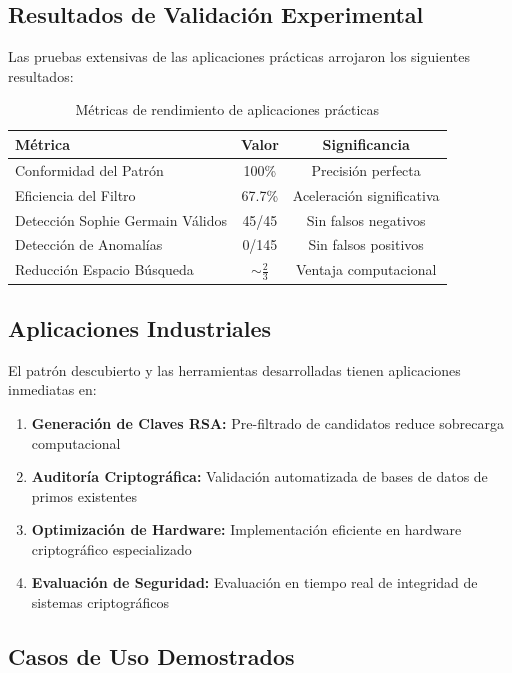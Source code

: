 \documentclass[11pt,a4paper]{article}
\theoremstyle{definition}
\theoremstyle{remark}
\begin{document}
\subsection{Resultados de Validación Experimental}

Las pruebas extensivas de las aplicaciones prácticas arrojaron los siguientes resultados:

\begin{table}[h]
\centering
\begin{tabular}{|l|c|c|}
\hline
\textbf{Métrica} & \textbf{Valor} & \textbf{Significancia} \\
\hline
Conformidad del Patrón & 100\% & Precisión perfecta \\
Eficiencia del Filtro & 67.7\% & Aceleración significativa \\
Detección Sophie Germain Válidos & 45/45 & Sin falsos negativos \\
Detección de Anomalías & 0/145 & Sin falsos positivos \\
Reducción Espacio Búsqueda & $\sim\frac{2}{3}$ & Ventaja computacional \\
\hline
\end{tabular}
\caption{Métricas de rendimiento de aplicaciones prácticas}
\end{table}

\subsection{Aplicaciones Industriales}

El patrón descubierto y las herramientas desarrolladas tienen aplicaciones inmediatas en:

\begin{enumerate}
    \item \textbf{Generación de Claves RSA:} Pre-filtrado de candidatos reduce sobrecarga computacional
    \item \textbf{Auditoría Criptográfica:} Validación automatizada de bases de datos de primos existentes
    \item \textbf{Optimización de Hardware:} Implementación eficiente en hardware criptográfico especializado
    \item \textbf{Evaluación de Seguridad:} Evaluación en tiempo real de integridad de sistemas criptográficos
\end{enumerate}

\subsection{Casos de Uso Demostrados}
\end{document}
